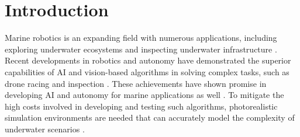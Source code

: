 \section{Introduction}\label{sec:intro}
Marine robotics is an expanding field with numerous applications, including exploring underwater ecosystems and inspecting underwater infrastructure \cite{applications}. Recent developments in robotics and autonomy have demonstrated the superior capabilities of \ac{AI} and vision-based algorithms in solving complex tasks, such as drone racing \cite{DRL_erdal,gatenet} and inspection \cite{mohit}. These achievements have shown promise in developing \ac{AI} and autonomy for marine applications as well \cite{DFKI}. To mitigate the high costs involved in developing and testing such algorithms, photorealistic simulation environments are needed that can accurately model the complexity of underwater scenarios \cite{mimir23}.






